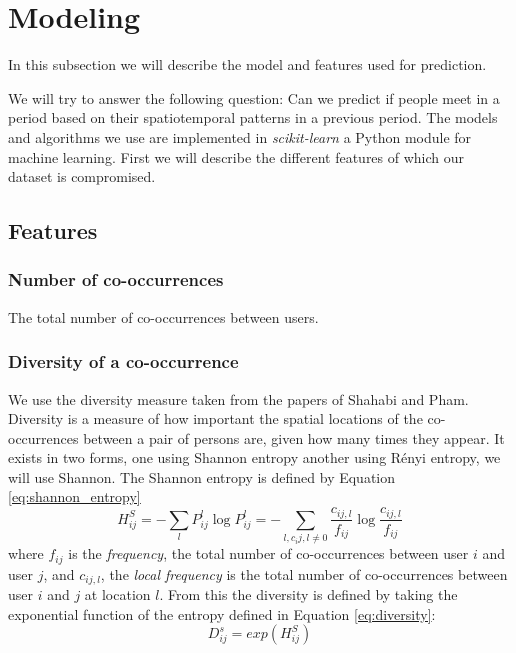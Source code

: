 \section{Modeling}
In this subsection we will describe the model and features used for prediction.

We will try to answer the following question: Can we predict if people meet in a period based on their spatiotemporal patterns in a previous period.
The models and algorithms we use are implemented in \textit{scikit-learn}\cite{scikit-learn} a Python module for machine learning. 
First we will describe the different features of which our dataset is compromised.
\subsection{Features}
\subsubsection{Number of co-occurrences}
The total number of co-occurrences between users.
\subsubsection{Diversity of a co-occurrence}
We use the diversity measure taken from the papers of Shahabi and Pham\cite{iRWRfSD}\cite{AEBMtISSfSD}.
Diversity is a measure of how important the spatial locations of the co-occurrences between a pair of persons are, given how many times they appear.
It exists in two forms, one using Shannon entropy another using Rényi entropy, we will use Shannon.
The Shannon entropy is defined by Equation \ref{eq:shannon_entropy}
\begin{equation}
\label{eq:shannon_entropy}
H^S_{ij}=-\sum\limits_{l}P^l_{ij} \log P^l_{ij}= -\sum\limits_{l,c_ij,l\neq 0}\frac{c_{ij,l}}{f_{ij}}\log \frac{c_{ij,l}}{f_{ij}}
\end{equation}
where $f_{ij}$ is the \textit{frequency}, the total number of co-occurrences between user $i$ and user $j$, and $c_{ij,l}$, the \textit{local frequency} is the total number of co-occurrences between user $i$ and $j$ at location $l$.
From this the diversity is defined by taking the exponential function of the entropy defined in Equation \ref{eq:diversity}:
\begin{equation}
\label{eq:diversity}
D^s_{ij} = exp(H^S_{ij})
\end{equation}

